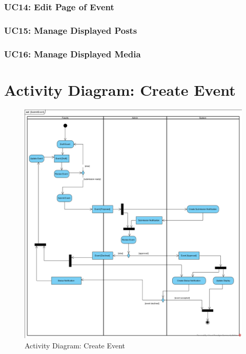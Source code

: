 \documentclass{article}
\begin{document}
\subsubsection{UC14: Edit Page of Event}

\subsubsection{UC15: Manage Displayed Posts}

\subsubsection{UC16: Manage Displayed Media}

\section{Activity Diagram: Create Event}
\begin{figure}[H]
    \centering
    \includegraphics[width=.98\textwidth]{images/SubmitEvent.png}
    \centering
    \caption{Activity Diagram: Create Event}
    \label{fig:activityDiagram}
\end{figure}
\end{document}
